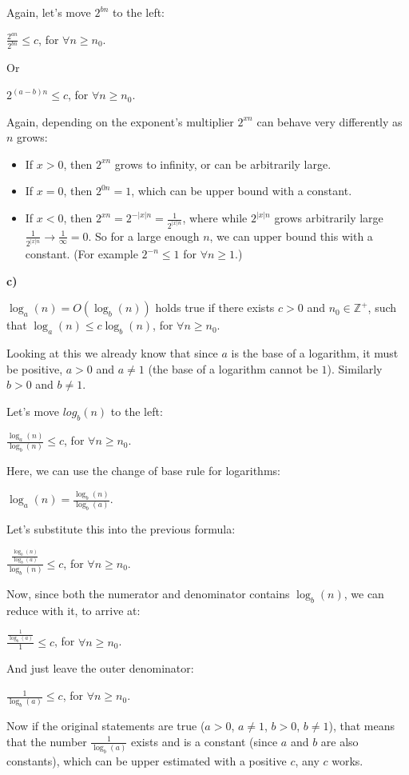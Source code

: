 Again, let's move $2^{bn}$ to the left:

$\frac{2^{an}}{2^{bn}} \leq{} c$, for $\forall{}n\geq{}n_0$.

Or

$2^{(a-b)n} \leq{} c$, for $\forall{}n\geq{}n_0$.

Again, depending on the exponent's multiplier $2^{xn}$ can behave very differently as $n$ grows:

\begin{itemize}
    \item If $x > 0$, then $2^{xn}$ grows to infinity, or can be arbitrarily large.
    \item If $x = 0$, then $2^{0n} = 1$, which can be upper bound with a constant.
    \item If $x < 0$, then $2^{xn} = 2^{-|x|n} = \frac{1}{2^{|x|n}}$, where while $2^{|x|n}$ grows arbitrarily large $\frac{1}{2^{|x|n}} \rightarrow \frac{1}{\infty} = 0$. So for a large enough $n$, we can upper bound this with a constant. (For example $2^{-n} \leq{} 1$ for $\forall{}n\geq{}1$.)
\end{itemize}

\textbf{c)}

$\log_a(n) = O(\log_b(n))$ holds true if there exists $c>0$ and $n_0\in{}\mathds{Z}^+$, such that $\log_a(n) \leq{} c\log_b(n)$, for $\forall{}n\geq{}n_0$.

Looking at this we already know that since $a$ is the base of a logarithm, it must be positive, $a>0$ and $a\neq{}1$ (the base of a logarithm cannot be $1$). Similarly $b>0$ and $b\neq{}1$.

Let's move $log_b(n)$ to the left:

$\frac{\log_a(n)}{\log_b(n)} \leq{} c$, for $\forall{}n\geq{}n_0$.

Here, we can use the change of base rule for logarithms:

$\log_a(n) = \frac{\log_b(n)}{\log_b(a)}$.

Let's substitute this into the previous formula:

$\frac{\frac{\log_b(n)}{\log_b(a)}}{\log_b(n)} \leq{} c$, for $\forall{}n\geq{}n_0$.

Now, since both the numerator and denominator contains $\log_b(n)$, we can reduce with it, to arrive at:

$\frac{\frac{1}{\log_b(a)}}{1} \leq{} c$, for $\forall{}n\geq{}n_0$.

And just leave the outer denominator:

$\frac{1}{\log_b(a)} \leq{} c$, for $\forall{}n\geq{}n_0$.

Now if the original statements are true ($a>0$, $a\neq{}1$, $b>0$, $b\neq{}1$), that means that the number $\frac{1}{\log_b(a)}$ exists and is a constant (since $a$ and $b$ are also constants), which can be upper estimated with a positive $c$, any $c$ works.
